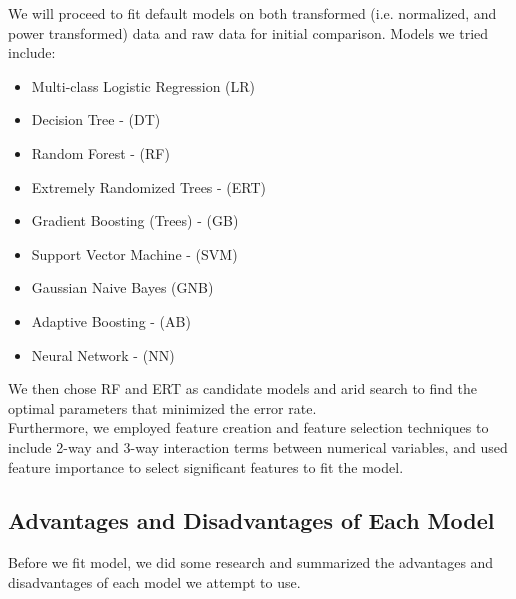 \documentclass[11pt]{article}
\begin{document}

\noindent We will proceed to fit default models on both transformed (i.e. normalized, and power transformed) data and raw data for initial comparison. Models we tried include:
\begin{itemize}
\setlength\itemsep{0cm}
\item Multi-class Logistic Regression (LR)
\item Decision Tree - (DT)
\item Random Forest - (RF)
\item Extremely Randomized Trees - (ERT)
\item Gradient Boosting (Trees) - (GB)
\item Support Vector Machine - (SVM)
\item Gaussian Naive Bayes (GNB)
\item Adaptive Boosting - (AB)
\item Neural Network - (NN)
\end{itemize}

We then chose RF and ERT as candidate models and arid search to find the optimal parameters that minimized the error rate. \\

\noindent Furthermore, we employed feature creation and feature selection techniques to include 2-way and 3-way interaction terms between numerical variables, and used feature importance to select significant features to fit the model. 

\subsection{Advantages and Disadvantages of Each Model}
Before we fit model, we did some research and summarized the advantages and disadvantages of each model we attempt to use.
\end{document}

